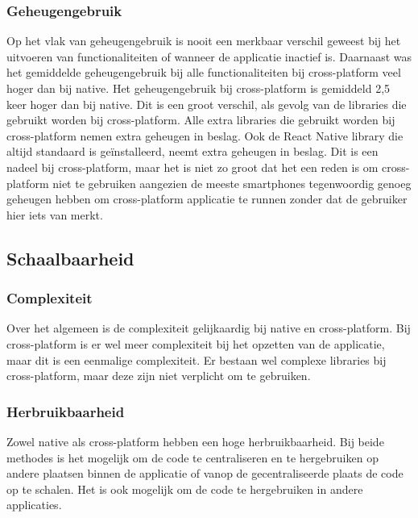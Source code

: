 \subsubsection{Geheugengebruik}
Op het vlak van geheugengebruik is nooit een merkbaar verschil geweest bij het uitvoeren van functionaliteiten 
of wanneer de applicatie inactief is. Daarnaast was het gemiddelde geheugengebruik bij alle functionaliteiten 
bij cross-platform veel hoger dan bij native. Het geheugengebruik bij cross-platform is gemiddeld 2,5 keer hoger
dan bij native. Dit is een groot verschil, als gevolg van de libraries die gebruikt worden bij cross-platform.
Alle extra libraries die gebruikt worden bij cross-platform nemen extra geheugen in beslag. Ook de React 
Native library die altijd standaard is geïnstalleerd, neemt extra geheugen in beslag. Dit is een nadeel bij
cross-platform, maar het is niet zo groot dat het een reden is om cross-platform niet te gebruiken aangezien 
de meeste smartphones tegenwoordig genoeg geheugen hebben om cross-platform applicatie te runnen zonder dat
de gebruiker hier iets van merkt.

\subsection{Schaalbaarheid}
\subsubsection{Complexiteit}
Over het algemeen is de complexiteit gelijkaardig bij native en cross-platform. Bij cross-platform is er wel
meer complexiteit bij het opzetten van de applicatie, maar dit is een eenmalige complexiteit. Er bestaan wel 
complexe libraries bij cross-platform, maar deze zijn niet verplicht om te gebruiken.

\subsubsection{Herbruikbaarheid}
Zowel native als cross-platform hebben een hoge herbruikbaarheid. Bij beide methodes is het mogelijk
om de code te centraliseren en te hergebruiken op andere plaatsen binnen de applicatie of vanop de 
gecentraliseerde plaats de code op te schalen. Het is ook mogelijk om de code te hergebruiken in 
andere applicaties.

